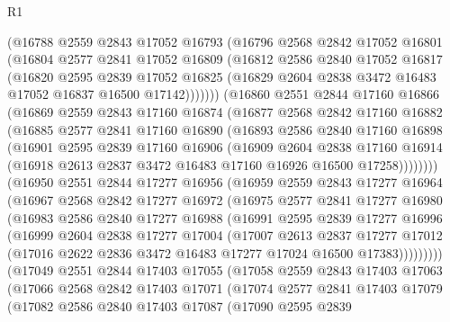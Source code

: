 \begin{lexlean}{R1}
\begin{coremodule}
      (@16788
        @2559
        @2843
        @17052
        @16793
        (@16796
          @2568
          @2842
          @17052
          @16801
          (@16804
            @2577
            @2841
            @17052
            @16809
            (@16812
              @2586
              @2840
              @17052
              @16817
              (@16820
                @2595
                @2839
                @17052
                @16825
                (@16829 @2604 @2838 @3472 @16483 @17052 @16837 @16500 @17142)))))))
    (@16860
      @2551
      @2844
      @17160
      @16866
      (@16869
        @2559
        @2843
        @17160
        @16874
        (@16877
          @2568
          @2842
          @17160
          @16882
          (@16885
            @2577
            @2841
            @17160
            @16890
            (@16893
              @2586
              @2840
              @17160
              @16898
              (@16901
                @2595
                @2839
                @17160
                @16906
                (@16909
                  @2604
                  @2838
                  @17160
                  @16914
                  (@16918 @2613 @2837 @3472 @16483 @17160 @16926 @16500 @17258))))))))
    (@16950
      @2551
      @2844
      @17277
      @16956
      (@16959
        @2559
        @2843
        @17277
        @16964
        (@16967
          @2568
          @2842
          @17277
          @16972
          (@16975
            @2577
            @2841
            @17277
            @16980
            (@16983
              @2586
              @2840
              @17277
              @16988
              (@16991
                @2595
                @2839
                @17277
                @16996
                (@16999
                  @2604
                  @2838
                  @17277
                  @17004
                  (@17007
                    @2613
                    @2837
                    @17277
                    @17012
                    (@17016 @2622 @2836 @3472 @16483 @17277 @17024 @16500 @17383)))))))))
    (@17049
      @2551
      @2844
      @17403
      @17055
      (@17058
        @2559
        @2843
        @17403
        @17063
        (@17066
          @2568
          @2842
          @17403
          @17071
          (@17074
            @2577
            @2841
            @17403
            @17079
            (@17082
              @2586
              @2840
              @17403
              @17087
              (@17090
                @2595
                @2839

\end{coremodule}
\end{lexlean}
